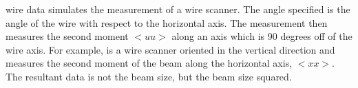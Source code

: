 \begin{description}
  \item{wire} \Newline
{} data simulates the measurement of a wire scanner. The angle specified
is the angle of the wire with respect to the horizontal axis. The measurement
then measures the second moment $<uu>$ along an axis which is 90 degrees off of
the wire axis. For example,  is a wire scanner oriented in the
vertical direction and measures the second moment of the beam along the
horizontal axis, $<xx>$. The resultant data is not the beam size, but the beam
size squared.

  \end{description}



